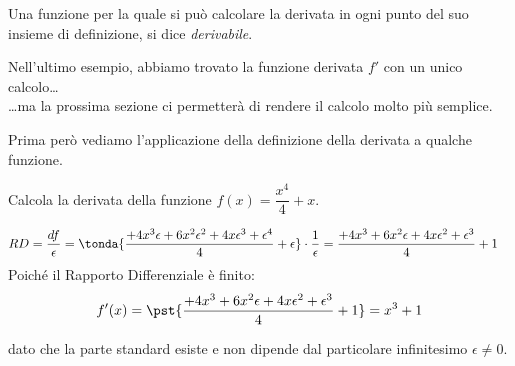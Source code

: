 \begin{definizione}
Una funzione per la quale si può calcolare la derivata in ogni punto 
del suo insieme di definizione, si dice \emph{derivabile}. 
\end{definizione}
Nell'ultimo esempio, abbiamo trovato la funzione derivata \(f'\) con un 
unico calcolo\dots\\
\dots ma la prossima sezione ci permetterà di rendere il calcolo molto più 
semplice.

Prima però vediamo l'applicazione della definizione della derivata a qualche 
funzione.


\begin{esempio}
\label{esem:diff_xallaquarta}
Calcola la derivata della funzione \(f(x)=\dfrac{x^4}{4} +x\).

\begin{align*}
RD &= \dfrac{df}{\epsilon} = 
\tonda{\dfrac{+4x^3\epsilon+6x^2\epsilon^2+4x\epsilon^3+\epsilon^4}{4} +
       \epsilon} \cdot \dfrac{1}{\epsilon} = 
\dfrac{+4x^3+6x^2\epsilon+4x\epsilon^2+\epsilon^3}{4} +1
\end{align*}
Poiché il Rapporto Differenziale è finito:
\[f'(x)=\pst{\dfrac{+4x^3+6x^2\epsilon+4x\epsilon^2+\epsilon^3}{4} +1} = 
x^3 +1\]

dato che la parte standard esiste e non dipende dal particolare 
infinitesimo \(\epsilon \ne 0\).
\end{esempio}

